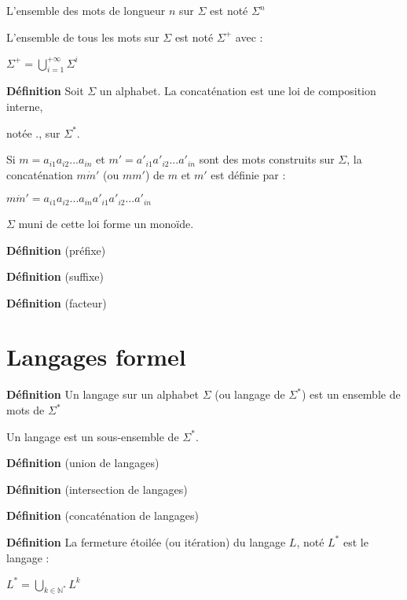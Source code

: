\documentclass[a4paper, 11pt, hidelinks]{article}
\newcommand{\de}{\large \textbf{Définition} \large }
\newcommand{\bs}{\bigskip}
\begin{document}
L'ensemble des mots de longueur $n$ sur $\Sigma$ est noté $\Sigma^n$

L'ensemble de tous les mots sur $\Sigma$ est noté $\Sigma^+$ avec :

$\Sigma^+= \displaystyle\bigcup_{i=1}^{+\infty} \Sigma^i$

\bs

\de Soit $\Sigma$ un alphabet. La concaténation est une loi de composition interne, 

notée $.$, sur $\Sigma^*$.

Si $m=a_{i1} a_{i2}... a_{in}$ et $m'=a'_{i1} a'_{i2}... a'_{in}$ sont des mots construits sur 
$\Sigma$, la concaténation $m\dot m'$ (ou $mm'$) de $m$ et $m'$ est définie par :

$m\dot m' =a_{i1} a_{i2}... a_{in} a'_{i1} a'_{i2}... a'_{in}$

$\Sigma$ muni de cette loi forme un monoïde.

\bs
\de (préfixe)

\bs
\de (suffixe)

\bs
\de (facteur)

\section{Langages formel}

\de Un langage sur un alphabet $\Sigma$ (ou langage de $\Sigma^*$) est un ensemble de mots de $\Sigma^*$

Un langage est un sous-ensemble de $\Sigma^*$.

\bs
\de (union de langages)

\bs
\de (intersection de langages)

\bs
\de (concaténation de langages)

\bs
\de La fermeture étoilée (ou itération) du langage $L$, noté $L^*$ est le langage :

$L^*=\displaystyle\bigcup_{k \in \mathbb{N}^*} L^k$
\end{document}
